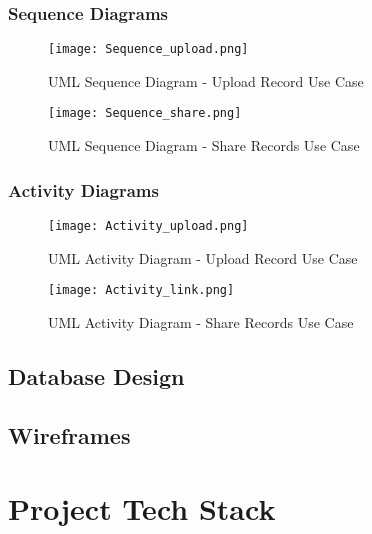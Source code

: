 \FloatBarrier
\clearpage

\subsubsection{Sequence Diagrams}

\begin{figure}[ht]
    \label{fig:sequence1}
        \centering
        \texttt{[image: Sequence\_upload.png]}
        \caption{UML Sequence Diagram - Upload Record Use Case}
\end{figure}

\begin{figure}[ht]
    \label{fig:sequence2}
        \centering
        \texttt{[image: Sequence\_share.png]}
        \caption{UML Sequence Diagram - Share Records Use Case}
\end{figure}

\FloatBarrier
\clearpage

\subsubsection{Activity Diagrams}

\begin{figure}[ht]
    \label{fig:activity1}
        \centering
        \texttt{[image: Activity\_upload.png]}
        \caption{UML Activity Diagram - Upload Record Use Case}
\end{figure}

\begin{figure}[ht]
    \label{fig:activity2}
        \centering
        \texttt{[image: Activity\_link.png]}
        \caption{UML Activity Diagram - Share Records Use Case}
\end{figure}

\FloatBarrier
\clearpage

\subsection{Database Design}

\subsection{Wireframes}

\section{Project Tech Stack}

